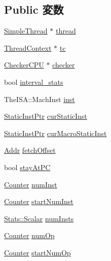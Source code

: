 \subsection*{Public 変数}
\begin{DoxyCompactItemize}
\item 
\hyperlink{classSimpleThread}{SimpleThread} $\ast$ \hyperlink{classBaseSimpleCPU_af9572fa907cd21b54cb14bd626010d39}{thread}
\item 
\hyperlink{classThreadContext}{ThreadContext} $\ast$ \hyperlink{classBaseSimpleCPU_a4455a4759e69e5ebe68ae7298cbcc37d}{tc}
\item 
\hyperlink{classCheckerCPU}{CheckerCPU} $\ast$ \hyperlink{classBaseSimpleCPU_aaa7fb8cd1a26ae3d37471b17ac031f73}{checker}
\item 
bool \hyperlink{classBaseSimpleCPU_a60dc78ede18ae1c296442fd0d1cde61b}{interval\_\-stats}
\item 
TheISA::MachInst \hyperlink{classBaseSimpleCPU_a3fb19fcd9c09cfac7357af074b301868}{inst}
\item 
\hyperlink{classRefCountingPtr}{StaticInstPtr} \hyperlink{classBaseSimpleCPU_abd80e0d70258dae9a743c9930a385163}{curStaticInst}
\item 
\hyperlink{classRefCountingPtr}{StaticInstPtr} \hyperlink{classBaseSimpleCPU_a52d6d2514fb5ccecad4788d57738f544}{curMacroStaticInst}
\item 
\hyperlink{base_2types_8hh_af1bb03d6a4ee096394a6749f0a169232}{Addr} \hyperlink{classBaseSimpleCPU_a0d06ede4b8656108bf00293f1ee0e035}{fetchOffset}
\item 
bool \hyperlink{classBaseSimpleCPU_ae91a837c03d66c9c15de3da2fc76e811}{stayAtPC}
\item 
\hyperlink{base_2types_8hh_ae1475755791765b8e6f6a8bb091e273e}{Counter} \hyperlink{classBaseSimpleCPU_a1431f3f73435dd9b1c68e7e3a303ada0}{numInst}
\item 
\hyperlink{base_2types_8hh_ae1475755791765b8e6f6a8bb091e273e}{Counter} \hyperlink{classBaseSimpleCPU_add074e8bdc5b62781b8ef02d666dc6b1}{startNumInst}
\item 
\hyperlink{classStats_1_1Scalar}{Stats::Scalar} \hyperlink{classBaseSimpleCPU_a302bf9a6fd3b54c46eb3e2bfb18a320e}{numInsts}
\item 
\hyperlink{base_2types_8hh_ae1475755791765b8e6f6a8bb091e273e}{Counter} \hyperlink{classBaseSimpleCPU_a0cb2e6732f2a0039cb918fc50956616a}{numOp}
\item 
\hyperlink{base_2types_8hh_ae1475755791765b8e6f6a8bb091e273e}{Counter} \hyperlink{classBaseSimpleCPU_ac574fb5f01568f023779519da07bf695}{startNumOp}

\end{DoxyCompactItemize}

